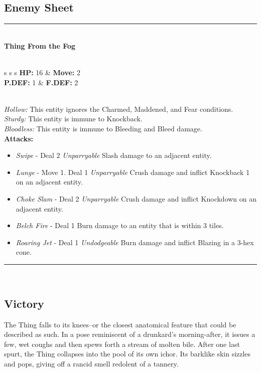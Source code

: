 \subsection*{Enemy Sheet}
\hrule
\ \\
{\large \textbf{Thing From the Fog}}\\\\
\begin{tabular}{s s s}
\textbf{HP:} 16 & \textbf{Move:} 2\\
\textbf{P.DEF:} 1 & \textbf{F.DEF:} 2 \\
\end{tabular}\\

\emph{Hollow:} This entity ignores the Charmed, Maddened, and Fear conditions.\\

\emph{Sturdy:} This entity is immune to Knockback.\\

\emph{Bloodless:} This entity is immune to Bleeding and Bleed damage.\\

\textbf{Attacks:}
\begin{itemize}
\item \emph{Swipe} -  Deal 2 \emph{Unparryable} Slash damage to an adjacent entity.
\item \emph{Lunge} - Move 1. Deal 1 \emph{Unparryable} Crush damage and inflict Knockback 1 on an adjacent entity.
\item \emph{Choke Slam} - Deal 2 \emph{Unparryable} Crush damage and inflict Knockdown on an adjacent entity.
\item \emph{Belch Fire} - Deal 1 Burn damage to an entity that is within 3 tiles.
\item \emph{Roaring Jet} - Deal 1 \emph{Undodgeable} Burn damage and inflict Blazing in a 3-hex cone.
\end{itemize}
\hrule
\ \\

\pagebreak

\subsection*{Victory}
The Thing falls to its knees--or the closest anatomical feature that could be described as such. In a pose reminiscent of a drunkard’s morning-after, it issues a few, wet coughs and then spews forth a stream of molten bile. After one last spurt, the Thing collapses into the pool of its own ichor. Its barklike skin sizzles and pops, giving off a rancid smell redolent of a tannery.\\

